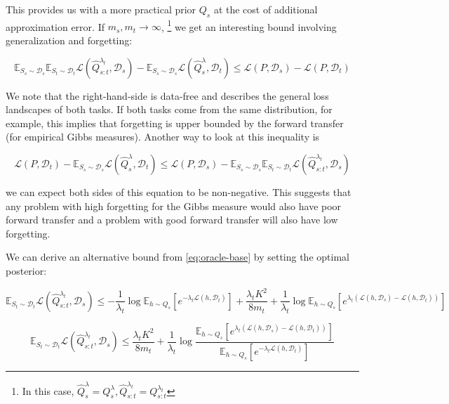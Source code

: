 \documentclass[letterpaper]{article}
\theoremstyle{definition}
\begin{document}
This provides us with a more practical prior $Q_s$ at the cost of additional approximation error.
If $m_s,m_t\rightarrow \infty$, \footnote{In this case, $\hat{Q}^\lambda_s=Q^\lambda_s, \hat{Q}^{\lambda_t}_{s:t}=Q^{\lambda_t}_{s:t}$} we get an interesting bound involving generalization and forgetting:

\begin{equation}
\mathbb{E}_{S_s\sim \mathcal{D}_s}\mathbb{E}_{S_t\sim \mathcal{D}_t}\mathcal{L}( \hat{Q}^{\lambda_t}_{s:t},\mathcal{D}_s)-\mathbb{E}_{S_s\sim \mathcal{D}_s}\mathcal{L}(\hat{Q}^\lambda_s,\mathcal{D}_t)\leq \mathcal{L}(P,\mathcal{D}_s)-\mathcal{L}(P,\mathcal{D}_t)
\end{equation}

We note that the right-hand-side is data-free and describes the general loss landscapes of both tasks. If both tasks come from the same distribution, for example, this implies that forgetting is upper bounded by the forward transfer (for empirical Gibbs measures).
Another way to look at this inequality is 

\begin{equation*}
\mathcal{L}(P,\mathcal{D}_t)-\mathbb{E}_{S_s\sim \mathcal{D}_s}\mathcal{L}(\hat{Q}^\lambda_s,\mathcal{D}_t)\leq \mathcal{L}(P,\mathcal{D}_s)-\mathbb{E}_{S_s\sim \mathcal{D}_s}\mathbb{E}_{S_t\sim \mathcal{D}_t}\mathcal{L}( \hat{Q}^{\lambda_t}_{s:t},\mathcal{D}_s)
\end{equation*}

we can expect both sides of this equation to be non-negative. This suggests that any problem with high forgetting for the Gibbs measure would also have poor forward transfer and a problem with good forward transfer will also have low forgetting.

We can derive an alternative bound from \eqref{eq:oracle-base} by setting the optimal posterior:

\begin{equation} 
\mathbb{E}_{S_t\sim \mathcal{D}_t}\mathcal{L}( \hat{Q}^{\lambda_t}_{s:t},\mathcal{D}_s)\leq -\frac{1}{\lambda_t}\log \mathbb{E}_{h\sim Q_s}\left [e^{-\lambda_t\mathcal{L}(h,\mathcal{D}_t)}\right ]+\frac{\lambda_t K^2}{8m_t}+\frac{1}{\lambda_t}\log\mathbb{E}_{h\sim Q_s}\left [e^{\lambda_t(\mathcal{L}(h,\mathcal{D}_s)-\mathcal{L}(h,\mathcal{D}_t))} \right ]
\end{equation}

$$
\mathbb{E}_{S_t\sim \mathcal{D}_t}\mathcal{L}( \hat{Q}^{\lambda_t}_{s:t},\mathcal{D}_s)\leq \frac{\lambda_t K^2}{8m_t}+\frac{1}{\lambda_t}\log\frac{\mathbb{E}_{h\sim Q_s}\left [e^{\lambda_t(\mathcal{L}(h,\mathcal{D}_s)-\mathcal{L}(h,\mathcal{D}_t))} \right ]}{\mathbb{E}_{h\sim Q_s}\left [e^{-\lambda_t\mathcal{L}(h,\mathcal{D}_t)}\right ]}
$$
\end{document}

